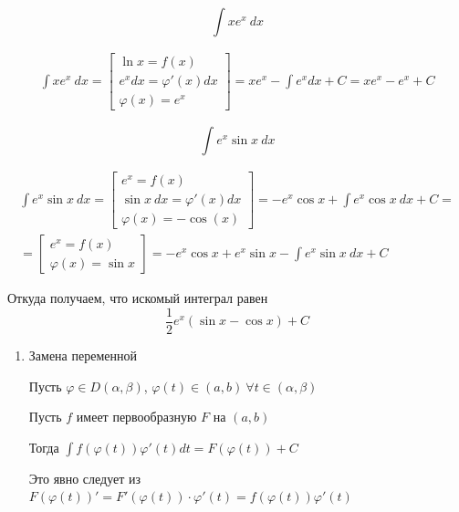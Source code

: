 \begin{example}{}{}
    \[
        \int x e^x \: dx
    \]
\end{example}

\begin{gather*}
    \int x e^x \: dx
        = \left[
            \begin{gathered}
                \ln x = f(x)
                \\
                e^x dx = \varphi' (x) dx
                \\
                \varphi (x) = e^x
            \end{gathered}
        \right] =
    x e^x - \int e^x dx + C = x e^x - e^x + C
\end{gather*}

\begin{example}{}{}
    \[
        \int e^x \sin x \: dx
    \]
\end{example}

\begin{gather*}
    \int e^x \sin x \: dx
        = \left[
            \begin{gathered}
                e^x = f(x)
                \\
                \sin x \: dx = \varphi' (x) dx
                \\
                \varphi(x) = - \cos (x)
            \end{gathered}
        \right] =
    - e^x \cos x + \int e^x \cos x \: dx + C =
    \\
    = \left[
        \begin{gathered}
            e^x = f(x)
            \\
            \varphi(x) = \sin x
        \end{gathered}
    \right] = 
    - e^x \cos x + e^x \sin x - \int e^x \sin x \: dx + C
\end{gather*}

Откуда получаем, что искомый интеграл равен
\[
    \frac{1}{2} e^x (\sin x - \cos x) + C
\]

\begin{enumerate}[start=3]
    \item
        Замена переменной

        Пусть \( \varphi \in D(\alpha, \beta) \), \( \varphi(t) \in (a, b) \ \forall t \in (\alpha, \beta) \)

        Пусть \( f \) имеет первообразную \( F \) на \( (a, b) \)

        Тогда
        \(
            \displaystyle
            \int f(\varphi(t)) \varphi'(t) dt = F(\varphi(t)) + C
        \)

        Это явно следует из \( F(\varphi(t))' = F'(\varphi(t)) \cdot \varphi'(t) = f(\varphi(t)) \varphi'(t) \)
\end{enumerate}

